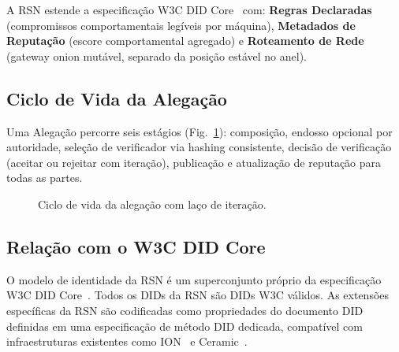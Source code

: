\documentclass[11pt,a4paper,twocolumn]{article}
\begin{document}
A RSN estende a especificação W3C DID Core~\cite{did2022} com: \textbf{Regras Declaradas} (compromissos comportamentais legíveis por máquina), \textbf{Metadados de Reputação} (escore comportamental agregado) e \textbf{Roteamento de Rede} (gateway onion mutável, separado da posição estável no anel).

\subsection{Ciclo de Vida da Alegação}

Uma Alegação percorre seis estágios (Fig.~\ref{fig:lifecycle}): composição, endosso opcional por autoridade, seleção de verificador via hashing consistente, decisão de verificação (aceitar ou rejeitar com iteração), publicação e atualização de reputação para todas as partes.

\begin{figure}[ht]
\centering
{}
\caption{Ciclo de vida da alegação com laço de iteração.}
\label{fig:lifecycle}
\end{figure}

\subsection{Relação com o W3C DID Core}

O modelo de identidade da RSN é um superconjunto próprio da especificação W3C DID Core~\cite{did2022}. Todos os DIDs da RSN são DIDs W3C válidos. As extensões específicas da RSN são codificadas como propriedades do documento DID definidas em uma especificação de método DID dedicada, compatível com infraestruturas existentes como ION~\cite{buchner2021} e Ceramic~\cite{ceramic2023}.
\end{document}
